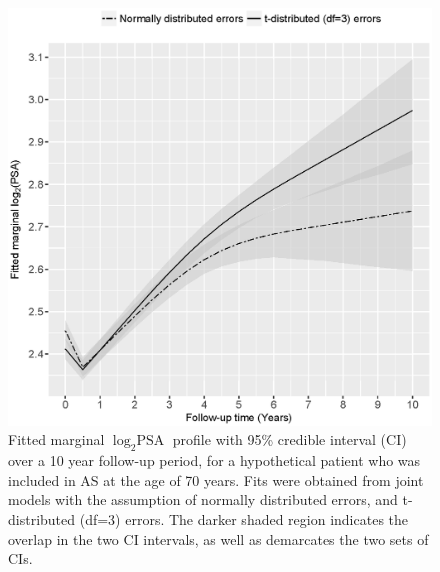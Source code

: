 \begin{enumerate}
    \begin{figure}[!htb]
    \centerline{\includegraphics[width=0.75\columnwidth]{images/model_fit/marginal_fitted_psa_NormalVsT3.eps}}
    \caption{Fitted marginal $\log_2 \mbox{PSA}$ profile with 95\% credible interval (CI) over a 10 year follow-up period, for a hypothetical patient who was included in AS at the age of 70 years. Fits were obtained from joint models with the assumption of normally distributed errors, and t-distributed (df=3) errors. The darker shaded region indicates the overlap in the two CI intervals, as well as demarcates the two sets of CIs.}
    \label{fig : marginal_fitted_psa_NormalVsT3}
    \end{figure}        
    

\end{enumerate}
